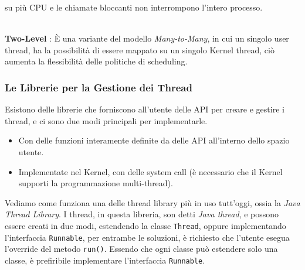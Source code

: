 \documentclass[12pt, letterpaper]{article}
\newcommand{\code}[1]{\colorbox{light-gray}{\texttt{#1}}}
\begin{document}
su più CPU e le chiamate bloccanti non interrompono l'intero processo.\begin{figure}[h]
\end{figure}
\\\textbf{Two-Level} : È una variante del modello \textit{Many-to-Many}, in cui un singolo user thread, ha la 
possibilità di essere mappato su un singolo Kernel thread, ciò aumenta la flessibilità delle politiche di scheduling.\begin{figure}[h]
\end{figure}
\subsubsection{Le Librerie per la Gestione dei Thread}
Esistono delle librerie che forniscono all'utente delle API per creare e gestire i thread, e ci sono due 
 modi principali per implementarle.\begin{itemize}
    \item Con delle funzioni interamente definite da delle API all'interno dello 
    spazio utente.
    \item Implementate nel Kernel, con delle system call (è necessario 
    che il Kernel supporti la programmazione multi-thread).
 \end{itemize}
 Vediamo come funziona una delle thread library più in uso tutt'oggi, 
 ossia la \textit{Java Thread Library}. I thread, in questa libreria, son 
 detti \textit{Java thread}, e possono essere creati in due modi, estendendo 
 la classe \code{Thread}, oppure implementando l'interfaccia 
 \code{Runnable}, per entrambe le soluzioni, è richiesto che l'utente 
 esegua l'override del metodo \code{run()}. Essendo che ogni classe 
 può estendere solo una classe, è prefiribile implementare l'interfaccia 
 \code{Runnable}.
\end{document}

